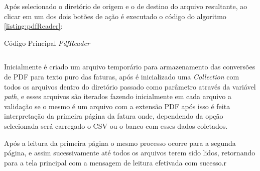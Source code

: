 Após selecionado o diretório de origem e o de destino do arquivo resultante, ao clicar em um dos dois botões de ação é executado o código do algoritmo \ref{listing:pdfReader}:

\begin{listing}[ht]
\caption{Código Principal \textit{PdfReader}}
\inputminted[frame=lines,
    firstline=26,
    lastline=52,
    framesep=5mm, fontsize=\footnotesize, linenos=true, label={App.java}]{java}{codigos/PdfReader/App.java}
\label{listing:pdfReader}
\end{listing}

Inicialmente é criado um arquivo temporário para armazenamento das conversões de PDF para texto puro das faturas, após é inicializado uma \textit{Collection} com todos os arquivos dentro do diretório passado como parâmetro através da variável \textit{path}, e esses arquivos são iterados fazendo inicialmente em cada arquivo a validação se o mesmo é um arquivo com a extensão PDF após isso é feita interpretação da primeira página da fatura onde, dependendo da opção selecionada será carregado o CSV ou o banco com esses dados coletados.

Após a leitura da primeira página o mesmo processo ocorre para a segunda página, e assim sucessivamente até todos os arquivos terem sido lidos, retornando para a tela principal com a mensagem de leitura efetivada com sucesso.r